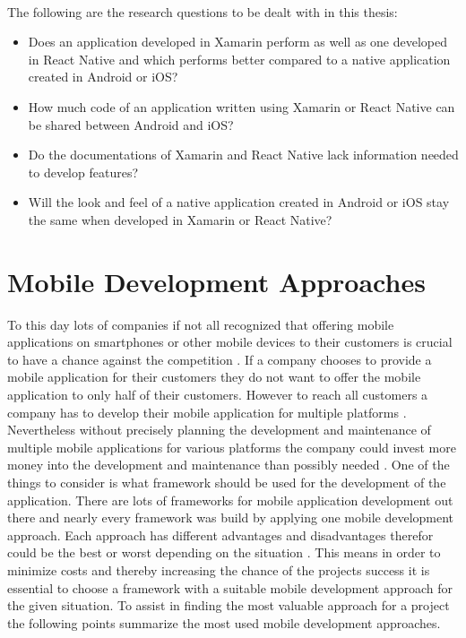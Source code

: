 \documentclass[Bachelor,BIF,english]{twbook}
\begin{document}
\\[\baselineskip]
The following are the research questions to be dealt with in this thesis:
\begin{itemize}
\item Does an application developed in Xamarin perform as well as one developed in React Native and which performs better compared to a native application created in Android or iOS?
\item How much code of an application written using Xamarin or React Native can be shared between Android and iOS?
\item Do the documentations of Xamarin and React Native lack information needed to develop features?
\item Will the look and feel of a native application created in Android or iOS stay the same when developed in Xamarin or React Native?
\end{itemize}

\chapter{Mobile Development Approaches}
To this day lots of companies if not all recognized that offering mobile applications on smartphones or other mobile devices to their customers is crucial to have a chance against the competition \cite[p.~1]{7479278}. If a company chooses to provide a mobile application for their customers they do not want to offer the mobile application to only half of their customers. However to reach all customers a company has to develop their mobile application for multiple platforms \cite[p.~5]{Steczko2016}.
\\[\baselineskip]
Nevertheless without precisely planning the development and maintenance of multiple mobile applications for various platforms the company could invest more money into the development and maintenance than possibly needed \cite[p.~1]{JohanssonSderberg2018} \cite[p.~8]{Steczko2016} \cite[p.~757]{Ciman2014}. One of the things to consider is what framework should be used for the development of the application. There are lots of frameworks for mobile application development out there and nearly every framework was build by applying one mobile development approach. Each approach has different advantages and disadvantages therefor could be the best or worst depending on the situation \cite{6420693} \cite{7934674}. This means in order to minimize costs and thereby increasing the chance of the projects success it is essential to choose a framework with a suitable mobile development approach for the given situation. To assist in finding the most valuable approach for a project the following points summarize the most used mobile development approaches. 
\end{document}
